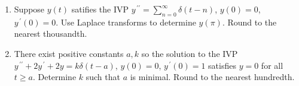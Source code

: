 \documentclass{ximera}
\begin{document}
\begin{enumerate}[label=(\arabic*)]
\item Suppose $y(t)$ satifies the IVP $\displaystyle y^{\,\prime\prime}=\sum_{n=0}^{\infty}\delta (t-n)$, $y(0)=0$, $y^{\,\prime}(0)=0$.  Use Laplace transforms to determine $y(\pi)$.  Round to the nearest thousandth.









\item There exist positive constants $a,k$ so the solution to the IVP\\ $y^{\,\prime\prime}+2y^{\,\prime}+2y=k\delta \left(t-a\right)$, $y(0)=0$, $y^{\,\prime}(0)=1$ satisfies $y=0$ for all $t\geq a$.  Determine $k$ such that $a$ is minimal. Round to the nearest hundredth.













\end{enumerate}
\end{document}
